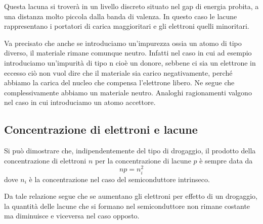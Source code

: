 Questa lacuna si troverà in un livello discreto situato nel gap di energia probita, a una distanza molto piccola dalla banda di valenza. In questo caso le lacune rappresentano i portatori di carica maggioritari e gli elettroni quelli minoritari.

Va precisato che anche se introduciamo un'impurezza ossia un atomo di tipo diverso, il materiale rimane comunque neutro. Infatti nel caso in cui ad esempio introduciamo un'impurità di tipo n cioè un donore, sebbene ci sia un elettrone in eccesso ciò non vuol dire che il materiale sia carico negativamente, perché abbiamo la carica del nucleo che compensa l'elettrone libero. Ne segue che complessivamente abbiamo un materiale neutro. Analoghi ragionamenti valgono nel caso in cui introduciamo un atomo accettore.

\subsection{Concentrazione di elettroni e lacune}
Si può dimostrare che, indipendentemente del tipo di drogaggio, il prodotto della concentrazione di elettroni $n$ per la concentrazione di lacune $p$ è sempre data da
\begin{equation*}
   np=n_i^2
\end{equation*}
dove $n_i$ è la concentrazione nel caso del semiconduttore intrinseco.

Da tale relazione segue che se aumentano gli elettroni per effetto di un drogaggio, la quantità delle lacune che si formano nel semiconduttore non rimane costante ma diminuisce e viceversa nel caso opposto. 

